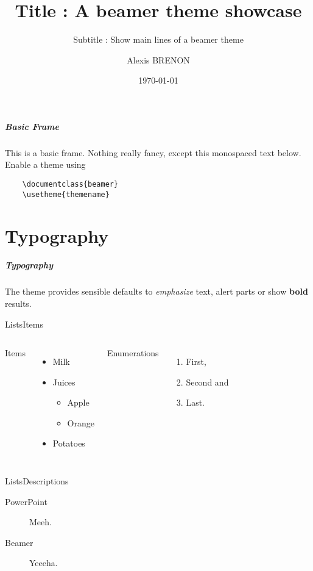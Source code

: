 \documentclass[aspectratio=169]{beamer}
\title{Title : A beamer theme showcase}
\subtitle{Subtitle : Show main lines of a beamer theme}
\date{\today}
\author{Alexis BRENON}
\institute{Institute or miscellaneous information}
\begin{document}
\openingpage

\begin{frame}[fragile]
  \frametitle{Basic Frame}

  This is a basic frame. Nothing really fancy, except this monospaced text below.
  Enable a theme using

  \begin{verbatim}
    \documentclass{beamer}
    \usetheme{themename}
  \end{verbatim}
\end{frame}

\part{Typography}
\partpage

\begin{frame}[fragile]
  \frametitle{Typography}
  
  The theme provides sensible defaults to \emph{emphasize} text,
  \alert{alert} parts or show \textbf{bold} results.
\end{frame}

\begin{frame}{Lists}{Items}
  \begin{columns}[onlytextwidth]
      Items
      \begin{itemize}
        \item Milk
        \item Juices \begin{itemize}
            \item Apple
            \item Orange
        \end{itemize}
        \item Potatoes
      \end{itemize}

      Enumerations
      \begin{enumerate}
        \item First, \item Second and \item Last.
      \end{enumerate}
  \end{columns}
\end{frame}

\begin{frame}{Lists}{Descriptions}
  \begin{description}
    \item[PowerPoint] Meeh.
    \item[Beamer] Yeeeha.
  \end{description}
\end{frame}
\end{document}
